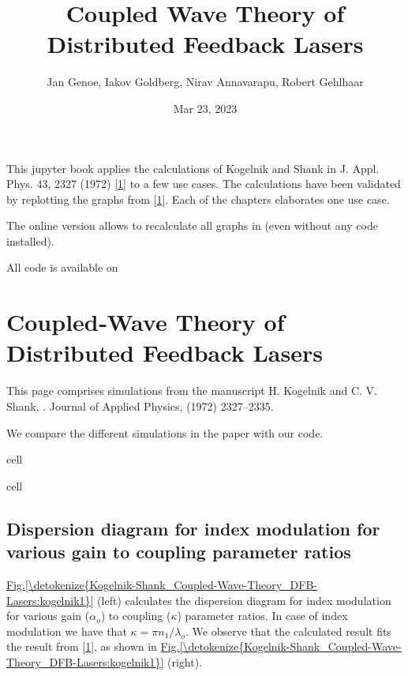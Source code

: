 \documentclass[a4paper,10pt,english,openany,oneside]{jupyterBook}
\title{Coupled Wave Theory of Distributed Feedback Lasers}
\date{Mar 23, 2023}
\author{Jan Genoe, Iakov Goldberg, Nirav Annavarapu, Robert Gehlhaar}
\begin{document}
\pagestyle{empty}
\sphinxmaketitle
\pagestyle{plain}
\sphinxtableofcontents
\pagestyle{normal}
\label{\detokenize{intro::doc}}


\sphinxAtStartPar
This jupyter book applies the calculations of Kogelnik and Shank in J. Appl. Phys. 43, 2327 (1972) {[}\hyperlink{cite.bib:id3}{1}{]} to a few use cases.
The calculations have been validated by replotting the graphs from {[}\hyperlink{cite.bib:id3}{1}{]}.
Each of the chapters elaborates one use case.

\sphinxAtStartPar
The online version allows to recalculate all graphs in  (even without any code installed).

\sphinxAtStartPar
All code is available on 

\sphinxstepscope


\chapter{Coupled‐Wave Theory of Distributed Feedback Lasers}
\label{\detokenize{Kogelnik-Shank_Coupled-Wave-Theory_DFB-Lasers:coupledwave-theory-of-distributed-feedback-lasers}}\label{\detokenize{Kogelnik-Shank_Coupled-Wave-Theory_DFB-Lasers::doc}}
\sphinxAtStartPar
This page comprises simulations from the manuscript H. Kogelnik and C. V. Shank, . Journal of Applied Physics,  (1972) 2327–2335. 

\sphinxAtStartPar
We compare the different simulations in the paper with our code.

\begin{sphinxuseclass}{cell}
\end{sphinxuseclass}
\begin{sphinxuseclass}{cell}
\end{sphinxuseclass}

\section{Dispersion diagram for index modulation for various gain to coupling parameter ratios}
\label{\detokenize{Kogelnik-Shank_Coupled-Wave-Theory_DFB-Lasers:dispersion-diagram-for-index-modulation-for-various-gain-to-coupling-parameter-ratios}}
\sphinxAtStartPar
\hyperref[\detokenize{Kogelnik-Shank_Coupled-Wave-Theory_DFB-Lasers:kogelnik1}]{Fig.\@ \ref{\detokenize{Kogelnik-Shank_Coupled-Wave-Theory_DFB-Lasers:kogelnik1}}} (left) calculates the dispersion diagram for index modulation for various gain (\(\alpha_o\)) to coupling (\(\kappa\)) parameter ratios. In case of index modulation we have that \(\kappa= \pi n_1/\lambda_o\). We observe that the calculated result fits the result from {[}\hyperlink{cite.bib:id3}{1}{]}, as shown in \hyperref[\detokenize{Kogelnik-Shank_Coupled-Wave-Theory_DFB-Lasers:kogelnik1}]{Fig.\@ \ref{\detokenize{Kogelnik-Shank_Coupled-Wave-Theory_DFB-Lasers:kogelnik1}}} (right).
\end{document}
